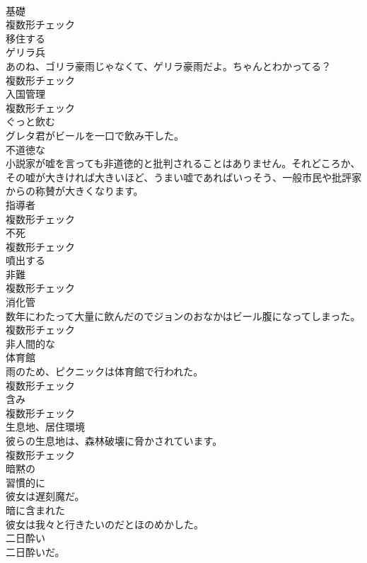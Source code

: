 \documentclass[8pt]{extreport}
\begin{document}
\begin{CJK}{UTF8}{min}
\\	[名詞]	基礎	
\\	複数形チェック
\\	[動詞]	移住する	
\\	[名詞]	ゲリラ兵	
\\	あのね、ゴリラ豪雨じゃなくて、ゲリラ豪雨だよ。ちゃんとわかってる？	
\\	複数形チェック
\\	[名詞]	入国管理	
\\	複数形チェック
\\	[動詞]	ぐっと飲む	
\\	グレタ君がビールを一口で飲み干した。	
\\	[形容詞]	不道徳な	
\\	小説家が嘘を言っても非道徳的と批判されることはありません。それどころか、その嘘が大きければ大きいほど、うまい嘘であればいっそう、一般市民や批評家からの称賛が大きくなります。	
\\	[名詞]	指導者	
\\	複数形チェック
\\	[名詞]	不死	
\\	複数形チェック
\\	[動詞]	噴出する	
\\	[名詞]	非難	
\\	複数形チェック
\\	[名詞]	消化管	
\\	数年にわたって大量に飲んだのでジョンのおなかはビール腹になってしまった。	
\\	複数形チェック
\\	[形容詞]	非人間的な	
\\	[名詞]	体育館	
\\	雨のため、ピクニックは体育館で行われた。	
\\	複数形チェック
\\	[名詞]	含み	
\\	複数形チェック
\\	[名詞]	生息地、居住環境	
\\	彼らの生息地は、森林破壊に脅かされています。	
\\	複数形チェック
\\	[形容詞]	暗黙の	
\\	[副詞]	習慣的に	
\\	彼女は遅刻魔だ。	
\\	[形容詞]	暗に含まれた	
\\	彼女は我々と行きたいのだとほのめかした。	
\\	[名詞]	二日酔い	
\\	二日酔いだ。	

\end{CJK}
\end{document}
